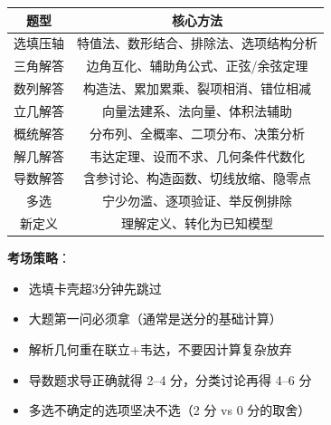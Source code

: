 \begin{center}
\begin{tabular}{c|c}
\textbf{题型} & \textbf{核心方法} \\ \hline
选填压轴 & 特值法、数形结合、排除法、选项结构分析 \\
三角解答 & 边角互化、辅助角公式、正弦/余弦定理 \\
数列解答 & 构造法、累加累乘、裂项相消、错位相减 \\
立几解答 & 向量法建系、法向量、体积法辅助 \\
概统解答 & 分布列、全概率、二项分布、决策分析 \\
解几解答 & 韦达定理、设而不求、几何条件代数化 \\
导数解答 & 含参讨论、构造函数、切线放缩、隐零点 \\
多选 & 宁少勿滥、逐项验证、举反例排除 \\
新定义 & 理解定义、转化为已知模型
\end{tabular}
\end{center}

\textbf{考场策略}：
\begin{itemize}
  \item 选填卡壳超3分钟先跳过
  \item 大题第一问必须拿（通常是送分的基础计算）
  \item 解析几何重在联立+韦达，不要因计算复杂放弃
  \item 导数题求导正确就得 2--4 分，分类讨论再得 4--6 分
  \item 多选不确定的选项坚决不选（2 分 vs 0 分的取舍）
\end{itemize}
